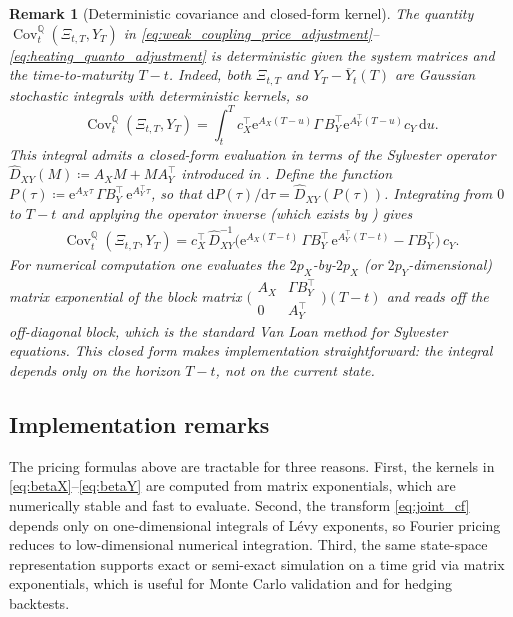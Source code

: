 \documentclass[10pt,a4paper,reqno]{amsart}
\newtheorem{remark}[theorem]{Remark}
\newcommand{\Q}{\mathbb{Q}}
\newcommand{\1}{\mathbbm{1}}
\newcommand{\dd}{\mathrm{d}}
\newcommand{\ee}{\mathrm{e}}
\DeclareMathOperator{\Cov}{Cov}
\begin{document}
\begin{remark}[Deterministic covariance and closed-form kernel]
\label{rem:det_cov}
The quantity $\Cov_t^\Q(\Xi_{t,T},Y_T)$ in
\eqref{eq:weak_coupling_price_adjustment}--\eqref{eq:heating_quanto_adjustment}
is \emph{deterministic} given the system matrices and the time-to-maturity
$T-t$. Indeed, both $\Xi_{t,T}$ and $Y_T - \overline{Y}_t(T)$ are
Gaussian stochastic integrals with deterministic kernels, so
$$
\Cov_t^\Q(\Xi_{t,T},Y_T)
= \int_t^T c_X^\top \ee^{A_X(T-u)} \Gamma\, B_Y^\top \ee^{A_Y^\top(T-u)} c_Y
  \,\dd u.
$$
This integral admits a closed-form evaluation in terms of the Sylvester
operator $\widehat{D}_{XY}(M) \coloneqq A_X M + M A_Y^\top$ introduced in
. Define the function
$P(\tau) \coloneqq \ee^{A_X\tau}\,\Gamma B_Y^\top\,\ee^{A_Y^\top\tau}$,
so that $\dd P(\tau)/\dd\tau = \widehat{D}_{XY}(P(\tau))$. Integrating from
$0$ to $T-t$ and applying the operator inverse (which exists by
) gives
\begin{align}\label{eq:cov_closed_form}
  \Cov_t^\Q(\Xi_{t,T},Y_T)
  = c_X^\top\,
    \widehat{D}_{XY}^{-1}\!\bigl(
      \ee^{A_X(T-t)}\,\Gamma B_Y^\top\,\ee^{A_Y^\top(T-t)}
      - \Gamma B_Y^\top
    \bigr)\,c_Y.
\end{align}
For numerical computation one evaluates the $2p_X$-by-$2p_X$ (or
$2p_Y$-dimensional) matrix exponential of the block matrix
$\bigl(\begin{smallmatrix}A_X & \Gamma B_Y^\top \\ 0 & A_Y^\top\end{smallmatrix}\bigr)(T-t)$
and reads off the off-diagonal block, which is the standard Van Loan method
for Sylvester equations.
This closed form makes implementation straightforward: the integral depends
only on the horizon $T-t$, not on the current state.
\end{remark}

\subsection{Implementation remarks}

The pricing formulas above are tractable for three reasons. First, the kernels in
\eqref{eq:betaX}--\eqref{eq:betaY} are computed from matrix exponentials, which
are numerically stable and fast to evaluate. Second, the transform
\eqref{eq:joint_cf} depends only on one-dimensional integrals of Lévy exponents,
so Fourier pricing reduces to low-dimensional numerical integration. Third, the
same state-space representation supports exact or semi-exact simulation on a
time grid via matrix exponentials, which is useful for Monte Carlo validation and
for hedging backtests.
\end{document}

